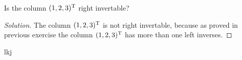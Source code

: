 \begin{exercise}
  Is the column $(1,2,3)^\mathrm{T}$ right invertable?
\end{exercise}
\begin{proof}[Solution]
  The column $(1,2,3)^\mathrm{T}$ is not right invertable, because
  as proved in previous exercise the column $(1,2,3)^\mathrm{T}$ has
  more than one left inverses.
\end{proof}
\begin{exercise}
  lkj
\end{exercise}











